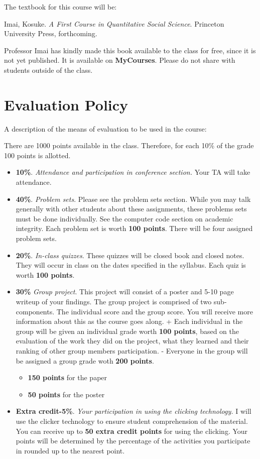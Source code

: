 \documentclass[11pt,]{article}
\begin{document}
The textbook for this course will be:

Imai, Kosuke. \emph{A First Course in Quantitative Social Science}.
Princeton University Press, forthcoming.

Professor Imai has kindly made this book available to the class for
free, since it is not yet published. It is available on
\textbf{MyCourses}. Please do not share with students outside of the
class.

\section{Evaluation Policy}\label{evaluation-policy}

A description of the means of evaluation to be used in the course:

There are 1000 points available in the class. Therefore, for each 10\%
of the grade 100 points is allotted.

\begin{itemize}
\item
  \textbf{10\%}. \emph{Attendance and participation in conference
  section.} Your TA will take attendance.
\item
  \textbf{40\%}. \emph{Problem sets}. Please see the problem sets
  section. While you may talk generally with other students about these
  assignments, these problems sets must be done individually. See the
  computer code section on academic integrity. Each problem set is worth
  \textbf{100 points}. There will be four assigned problem sets.
\item
  \textbf{20\%}. \emph{In-class quizzes}. These quizzes will be closed
  book and closed notes. They will occur in class on the dates specified
  in the syllabus. Each quiz is worth \textbf{100 points}.
\item
  \textbf{30\%} \emph{Group project}. This project will consist of a
  poster and 5-10 page writeup of your findings. The group project is
  comprised of two sub-components. The individual score and the group
  score. You will receive more information about this as the course goes
  along. + Each individual in the group will be given an individual
  grade worth \textbf{100 points}, based on the evaluation of the work
  they did on the project, what they learned and their ranking of other
  group members participation. - Everyone in the group will be assigned
  a group grade woth \textbf{200 points}.

  \begin{itemize}
  \itemsep1pt\parskip0pt
  \item
    \textbf{150 points} for the paper
  \item
    \textbf{50 points} for the poster
  \end{itemize}
\item
  \textbf{Extra credit-5\%}. \emph{Your participation in using the
  clicking technology.} I will use the clicker technology to ensure
  student comprehension of the material. You can receive up to
  \textbf{50 extra credit points} for using the clicking. Your points
  will be determined by the percentage of the activities you participate
  in rounded up to the nearest point.
\end{itemize}
\end{document}
